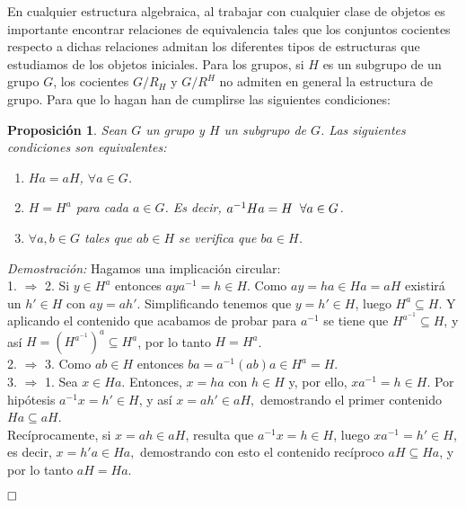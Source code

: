 \documentclass[12pt]{article}
\newtheorem{proposition}[theorem]{Proposición}
\begin{document}
En cualquier estructura algebraica, al trabajar con cualquier clase de objetos es importante encontrar relaciones de equivalencia tales que los conjuntos cocientes respecto a dichas relaciones admitan los diferentes tipos de estructuras que estudiamos de los objetos iniciales. Para los grupos, si $H$ es un subgrupo de un grupo $G$, los cocientes $G/R_{H}$ y $G/R^{H}$ no admiten en general la estructura de grupo. Para que lo hagan han de cumplirse las siguientes condiciones:

\begin{proposition} Sean $G$ un grupo y $H$ un subgrupo de $G$. Las siguientes condiciones son equivalentes:
\begin{enumerate}
\item $Ha = aH$, $\forall  a \in G$.
\item $H = H^{a}$ para cada $a \in G$. Es decir, $a^{-1}Ha = H \hspace{0.2cm} \forall a\in G$.
\item $\forall a,b \in G$ tales que $ab \in H$ se verifica que $ba \in H$.
\end{enumerate}
\end{proposition}
\emph{Demostración: } Hagamos una implicación circular:\vspace{0.2cm}\\
1. $\Rightarrow$ 2. Si $y \in H^{a}$ entonces $aya^{-1} = h \in H$. Como $ay = ha \in Ha = aH$ existirá un $h' \in H$ con $ay = ah'$. Simplificando tenemos que $y = h' \in H$, luego $H^{a}\subseteq H$. Y aplicando el contenido que acabamos de probar para $a^{-1}$ se tiene que $H^{a^{-1}}\subseteq H$, y así $H = (H^{a^{-1}})^{a}\subseteq H^{a}$, por lo tanto $H = H^{a}$.\vspace{0.2cm}\\
2.  $\Rightarrow$ 3. Como $ab \in H$ entonces $ba = a^{-1}(ab)a \in H^{a} = H.$\vspace{0.2cm}\\
3.  $\Rightarrow$ 1. Sea $x \in Ha$. Entonces, $x = ha$ con $h \in H$ y, por ello, $xa^{-1} = h \in H.$ Por hipótesis $a^{-1}x = h' \in H$, y así $x = ah'\in aH,$ demostrando el primer contenido $Ha \subseteq aH$.\vspace{0.2cm}\\ Recíprocamente, si $x = ah \in aH$, resulta que $a^{-1}x = h \in H$, luego $xa^{-1} = h' \in H$, es decir, $x = h'a \in Ha,$ demostrando con esto el contenido recíproco $aH \subseteq Ha$, y por lo tanto $aH = Ha$.

$\hfill \square$
\end{document}
